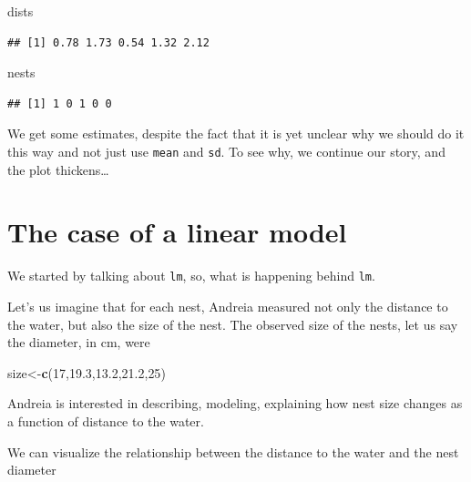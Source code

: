 \documentclass[
]{book}
\newenvironment{Shaded}{\begin{snugshade}}{\end{snugshade}}
\newcommand{\DecValTok}[1]{\textcolor[rgb]{0.00,0.00,0.81}{#1}}
\newcommand{\FloatTok}[1]{\textcolor[rgb]{0.00,0.00,0.81}{#1}}
\newcommand{\FunctionTok}[1]{\textcolor[rgb]{0.13,0.29,0.53}{\textbf{#1}}}
\newcommand{\NormalTok}[1]{#1}
\newcommand{\OtherTok}[1]{\textcolor[rgb]{0.56,0.35,0.01}{#1}}
\begin{document}
\begin{Shaded}
\begin{Highlighting}[]
\NormalTok{dists}
\end{Highlighting}
\end{Shaded}

\begin{verbatim}
## [1] 0.78 1.73 0.54 1.32 2.12
\end{verbatim}

\begin{Shaded}
\begin{Highlighting}[]
\NormalTok{nests}
\end{Highlighting}
\end{Shaded}

\begin{verbatim}
## [1] 1 0 1 0 0
\end{verbatim}

We get some estimates, despite the fact that it is yet unclear why we should do it this way and not just use \texttt{mean} and \texttt{sd}. To see why, we continue our story, and the plot thickens\ldots{}

\hypertarget{the-case-of-a-linear-model}{%
\section{The case of a linear model}\label{the-case-of-a-linear-model}}

We started by talking about \texttt{lm}, so, what is happening behind \texttt{lm}.

Let's us imagine that for each nest, Andreia measured not only the distance to the water, but also the size of the nest. The observed size of the nests, let us say the diameter, in cm, were

\begin{Shaded}
\begin{Highlighting}[]
\NormalTok{size}\OtherTok{\textless{}{-}}\FunctionTok{c}\NormalTok{(}\DecValTok{17}\NormalTok{,}\FloatTok{19.3}\NormalTok{,}\FloatTok{13.2}\NormalTok{,}\FloatTok{21.2}\NormalTok{,}\DecValTok{25}\NormalTok{)}
\end{Highlighting}
\end{Shaded}

Andreia is interested in describing, modeling, explaining how nest size changes as a function of distance to the water.

We can visualize the relationship between the distance to the water and the nest diameter
\end{document}
